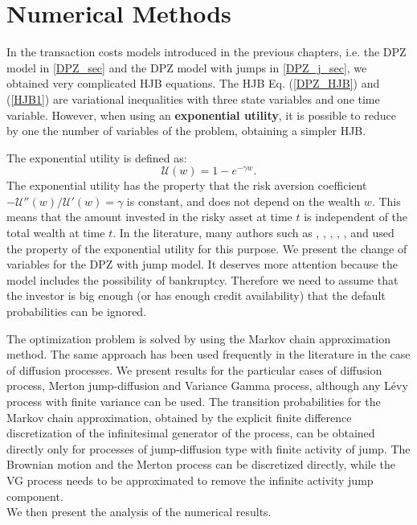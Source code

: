

\chapter{Numerical Methods}\label{Chapter6}
\minitoc%

\vspace{5em}


In the transaction costs models introduced in the previous chapters, i.e. the DPZ model in \ref{DPZ_sec} and the DPZ model with jumps in \ref{DPZ_j_sec}, 
we obtained very complicated HJB equations.
The HJB Eq. (\ref{DPZ_HJB}) and (\ref{HJB1}) are variational inequalities with three state variables and one time variable. 
However, when using an \textbf{exponential utility}, it is possible to reduce by one the number of variables of the 
problem, obtaining a simpler HJB.

The exponential utility is defined as:
\begin{equation}\label{exp_util}
 \mathcal{U}(w) = 1- e^{-\gamma w}.
\end{equation}
The exponential utility has the property that the risk aversion coefficient $-\mathcal{U}''(w) / \mathcal{U}'(w) = \gamma$ 
is constant, and does not depend on the wealth $w$.
This means that the amount invested in the risky asset at time $t$ is independent of the total wealth at time $t$.
In the literature, many authors such as \cite{HoNe89}, \cite{DaPaZa93}, \cite{DaPa94}, \cite{ClHo97}, \cite{Damgaard}, \cite{Mon03} and \cite{Mon04}
used the property of the exponential utility for this purpose. 
We present the change of variables for the DPZ with jump model. It deserves more attention because the model includes the possibility of bankruptcy. Therefore 
we need to assume that the investor is big enough (or has enough credit availability) that the default probabilities can be ignored.

The optimization problem is solved by using the Markov chain approximation method. The same approach has been used 
frequently in the literature in the case of diffusion processes. 
We present results for the particular cases of diffusion process, Merton jump-diffusion and Variance Gamma process, although any Lévy process with finite variance can be used. 
The transition probabilities for the Markov chain approximation, obtained by the explicit finite difference discretization of the 
infinitesimal generator of the process, can be obtained directly only for processes of jump-diffusion type with finite activity of jump. 
The Brownian motion and the Merton process can be discretized directly, 
while the VG process needs to be approximated to remove the infinite activity jump component.\\
We then present the analysis of the numerical results.  

